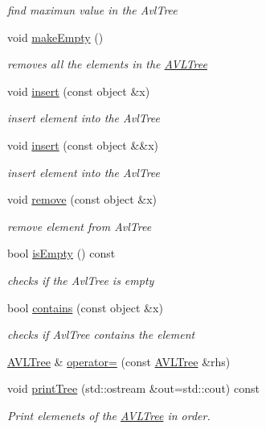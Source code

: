 \begin{DoxyCompactItemize}
\begin{DoxyCompactList}\small\item\em find maximun value in the Avl\+Tree \end{DoxyCompactList}\item 
\hypertarget{class_a_v_l_tree_ae4693e692f12c92e75a2519ebc15ed0d}{}\label{class_a_v_l_tree_ae4693e692f12c92e75a2519ebc15ed0d} 
void \hyperlink{class_a_v_l_tree_ae4693e692f12c92e75a2519ebc15ed0d}{make\+Empty} ()
\begin{DoxyCompactList}\small\item\em removes all the elements in the \hyperlink{class_a_v_l_tree}{A\+V\+L\+Tree} \end{DoxyCompactList}\item 
void \hyperlink{class_a_v_l_tree_ae767da0ef324212a6b60d2c735f4546b}{insert} (const object \&x)
\begin{DoxyCompactList}\small\item\em insert element into the Avl\+Tree \end{DoxyCompactList}\item 
void \hyperlink{class_a_v_l_tree_ac2e624021d1bed72ccccee5bd0eea85c}{insert} (const object \&\&x)
\begin{DoxyCompactList}\small\item\em insert element into the Avl\+Tree \end{DoxyCompactList}\item 
void \hyperlink{class_a_v_l_tree_addcc3b4db7631a7c21ca43a9ac3b1a84}{remove} (const object \&x)
\begin{DoxyCompactList}\small\item\em remove element from Avl\+Tree \end{DoxyCompactList}\item 
bool \hyperlink{class_a_v_l_tree_a27d1c8fac94be14ce1ab128aebe84914}{is\+Empty} () const
\begin{DoxyCompactList}\small\item\em checks if the Avl\+Tree is empty \end{DoxyCompactList}\item 
bool \hyperlink{class_a_v_l_tree_a515e54ca6d0cf55b233f306b03f6c565}{contains} (const object \&x)
\begin{DoxyCompactList}\small\item\em checks if Avl\+Tree contains the element \end{DoxyCompactList}\item 
\hyperlink{class_a_v_l_tree}{A\+V\+L\+Tree} \& \hyperlink{class_a_v_l_tree_a449ca1d3b6daeeb26870d4f0c9723be2}{operator=} (const \hyperlink{class_a_v_l_tree}{A\+V\+L\+Tree} \&rhs)
\item 
void \hyperlink{class_a_v_l_tree_a9ad949733d3d166d12125cd7ab483fde}{print\+Tree} (std\+::ostream \&out=std\+::cout) const
\begin{DoxyCompactList}\small\item\em Print elemenets of the \hyperlink{class_a_v_l_tree}{A\+V\+L\+Tree} in order. \end{DoxyCompactList}\end{DoxyCompactItemize}


